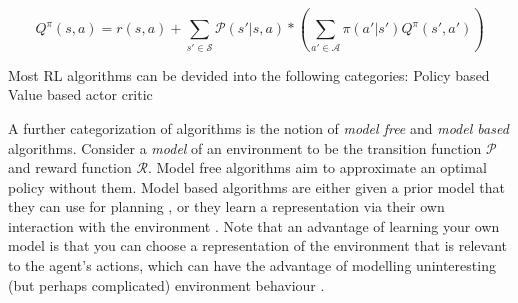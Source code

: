 \documentclass{../main.tex}{subfiles}
\begin{document}
\begin{equation}\label{equation:bellman:action-value-function}
Q^{\pi}(s, a) = r(s, a) + \sum_{s' \in \mathcal{S}} \mathcal{P}(s' | s, a) * (\sum_{a' \in \mathcal{A}} \pi(a' | s') Q^{\pi}(s', a'))
\end{equation}


Most RL algorithms can be devided into the following categories:
Policy based
Value based
actor critic

A further categorization of algorithms is the notion of \textit{model free} and \textit{model based} algorithms. Consider a \textit{model} of an environment to be the transition function $\mathcal{P}$ and reward function $\mathcal{R}$. Model free algorithms aim to approximate an optimal policy without them. Model based algorithms are either given a prior model that they can use for planning \citep{browne2012survey, Soemers2014}, or they learn a representation via their own interaction with the environment \citep{Sutton1991, Guzdial2017}. Note that an advantage of learning your own model is that you can choose a representation of the environment that is relevant to the agent's actions, which can have the advantage of modelling uninteresting (but perhaps complicated) environment behaviour \citep{Pathak2017}.
\end{document}
